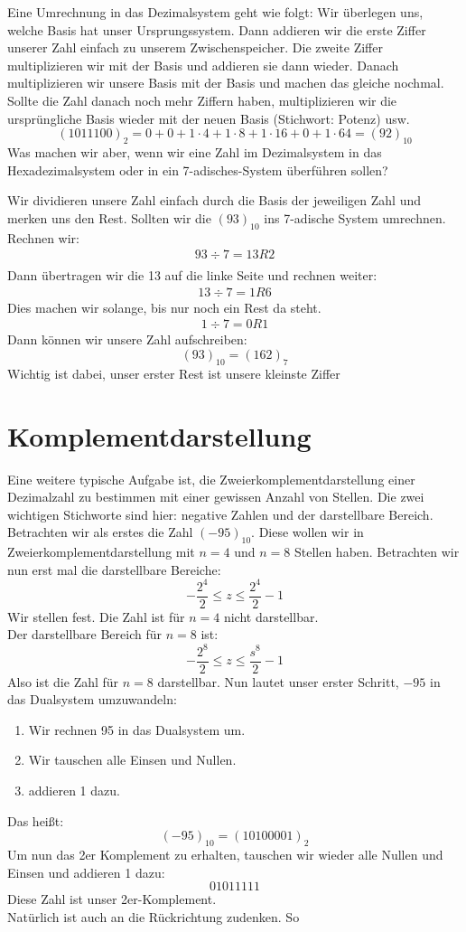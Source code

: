 Eine Umrechnung in das Dezimalsystem geht wie folgt:
Wir überlegen uns, welche Basis hat unser Ursprungssystem. Dann addieren wir die erste Ziffer unserer Zahl einfach zu unserem Zwischenspeicher. Die zweite Ziffer multiplizieren wir mit der Basis und addieren sie dann wieder. Danach multiplizieren wir unsere Basis mit der Basis und machen das gleiche nochmal. Sollte die Zahl danach noch mehr Ziffern haben, multiplizieren wir die ursprüngliche Basis wieder mit der neuen Basis (Stichwort: Potenz) usw.
\[
	(1011100)_2 = 0 + 0 + 1\cdot 4 + 1\cdot 8 + 1\cdot 16 + 0+ 1\cdot 64 = (92)_{10}
\]
Was machen wir aber, wenn wir eine Zahl im Dezimalsystem in das Hexadezimalsystem oder in ein 7-adisches-System überführen sollen?

Wir dividieren unsere Zahl einfach durch die Basis der jeweiligen Zahl und merken uns den Rest. 
Sollten wir die $(93)_{10}$ ins 7-adische System umrechnen. Rechnen wir:
\begin{align*}
	93 \div 7 = 13 R 2 \\
\end{align*}
Dann übertragen wir die 13 auf die linke Seite und rechnen weiter:
\begin{align*}
	13 \div 7 = 1 R 6
\end{align*}
Dies machen wir solange, bis nur noch ein Rest da steht.
\begin{align*}
	1 \div 7 = 0 R 1
\end{align*}
Dann können wir unsere Zahl aufschreiben:
\[
	(93)_{10} = (162)_{7}
\]
Wichtig ist dabei, unser erster Rest ist unsere kleinste Ziffer

\section*{Komplementdarstellung}
Eine weitere typische Aufgabe ist, die Zweierkomplementdarstellung einer Dezimalzahl zu bestimmen mit einer gewissen Anzahl von Stellen.
Die zwei wichtigen Stichworte sind hier: negative Zahlen und der darstellbare Bereich.\\

Betrachten wir als erstes die Zahl $(-95)_{10}$. Diese wollen wir in Zweierkomplementdarstellung mit $n=4$ und $n=8$ Stellen haben. Betrachten wir nun erst mal die darstellbare Bereiche:
\[
-\frac{2^{4}}{2} \le z \le \frac{2^{4}}{2}-1
\]
Wir stellen fest. Die Zahl ist für $n=4$ nicht darstellbar. \\
Der darstellbare Bereich für $n=8$ ist:
\[
-\frac{2^{8}}{2} \le  z  \le  \frac{s^{8}}{2}-1
\]
Also ist die Zahl für $n=8$ darstellbar. Nun lautet unser erster Schritt, $-95$ in das Dualsystem umzuwandeln:
\begin{enumerate}
	\item Wir rechnen 95 in das Dualsystem um.
	\item Wir tauschen alle Einsen und Nullen. 
	\item addieren 1 dazu.
\end{enumerate}
Das heißt:
\[
	(-95)_{10} = (10100001)_2 
\]
Um nun das 2er Komplement zu erhalten, tauschen wir wieder alle Nullen und Einsen und addieren 1 dazu:
\[
01011111
\]
Diese Zahl ist unser 2er-Komplement.\\
Natürlich ist auch an die Rückrichtung zudenken. So

